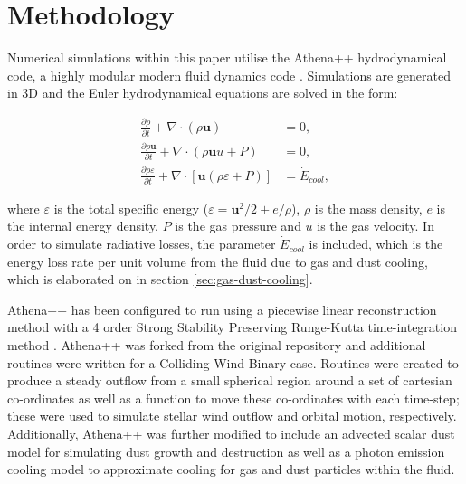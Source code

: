 
\section{Methodology}

Numerical simulations within this paper utilise the Athena++ hydrodynamical code, a highly modular modern fluid dynamics code \parencite{stoneAthenaAdaptiveMesh2020}.
Simulations are generated in 3D and the Euler hydrodynamical equations are solved in the form:

\begin{subequations}
  \begin{align}
    \frac{\partial\rho}{\partial t}+\nabla \cdot \left(\rho \boldsymbol{u}\right) & = 0 , \\
    \frac{\partial \rho \boldsymbol{u}}{\partial t} + \nabla \cdot \left(\rho \boldsymbol{u} u + P \right) & = 0, \\
    \frac{\partial \rho \varepsilon}{\partial t} + \nabla \cdot \left[ \boldsymbol{u} \left( \rho\varepsilon + P \right) \right] & = \dot E_{cool} , 
  \end{align}
\end{subequations}

\noindent
where $\varepsilon$ is the total specific energy ($\varepsilon = \boldsymbol{u}^2/2 + e/\rho $), $\rho$ is the mass density, $e$ is the internal energy density, $P$ is the gas pressure and $u$ is the gas velocity.
In order to simulate radiative losses, the parameter $\dot E_{cool}$ is included, which is the energy loss rate per unit volume from the fluid due to gas and dust cooling, which is elaborated on in section \ref{sec:gas-dust-cooling}.


Athena++ has been configured to run using a piecewise linear reconstruction method with a 4 order Strong Stability Preserving Runge-Kutta time-integration method \parencite{spiteriNewClassOptimal2002}.
Athena++ was forked from the original repository and additional routines were written for a Colliding Wind Binary case.
Routines were created to produce a steady outflow from a small spherical region around a set of cartesian co-ordinates as well as a function to move these co-ordinates with each time-step; these were used to simulate stellar wind outflow and orbital motion, respectively.
Additionally, Athena++ was further modified to include an advected scalar dust model for simulating dust growth and destruction as well as a photon emission cooling model to approximate cooling for gas and dust particles within the fluid.

